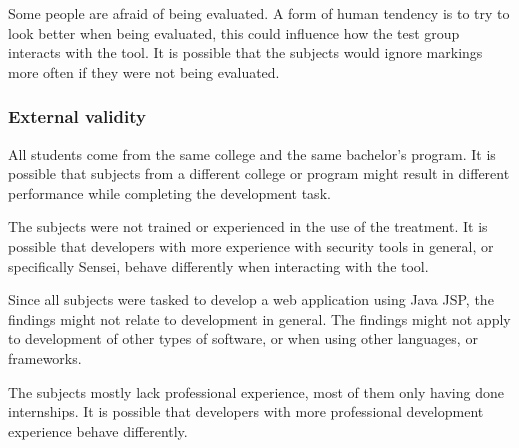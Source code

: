 Some people are afraid of being evaluated.
A form of human tendency is to try to look better when being evaluated, this could influence how the test group interacts with the tool.
It is possible that the subjects would ignore markings more often if they were not being evaluated.

\subsubsection{External validity}%
All students come from the same college and the same bachelor's program.
It is possible that subjects from a different college or program might result in different performance while completing the development task.

The subjects were not trained or experienced in the use of the treatment.
It is possible that developers with more experience with security tools in general, or specifically Sensei, behave differently when interacting with the tool.

Since all subjects were tasked to develop a web application using Java JSP, the findings might not relate to development in general.
The findings might not apply to development of other types of software, or when using other languages, or frameworks. 

The subjects mostly lack professional experience, most of them only having done internships.
It is possible that developers with more professional development experience behave differently.